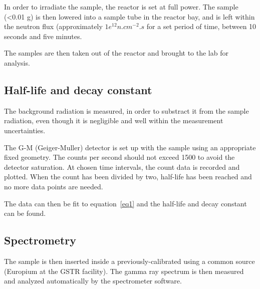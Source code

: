 In order to irradiate the sample, the reactor is set at full power. The sample (<0.01 g) is then lowered into a sample tube in the reactor bay, and is left within the neutron flux (approximately $1e^{12} n.cm^{-2}.s$  for a set period of time, between 10 seconds and five minutes.

The samples are then taken out of the reactor and brought to the lab for analysis.

\subsection{Half-life and decay constant}

The background radiation is measured, in order to substract it from the sample radiation, even though it is negligible and well within the measurement uncertainties.

The G-M (Geiger-Muller) detector is set up with the sample using an appropriate fixed geometry. The counts per second should not exceed 1500 to avoid the detector saturation. At chosen time intervals, the count data is recorded and plotted. When the count has been divided by two, half-life has been reached and no more data points are needed.

The data can then be fit to equation~\ref{eq1} and the half-life and decay constant can be found.

\subsection{Spectrometry}

The sample is then inserted inside a previously-calibrated using a common source (Europium at the GSTR facility). The gamma ray spectrum is then measured and analyzed automatically by the spectrometer software.
